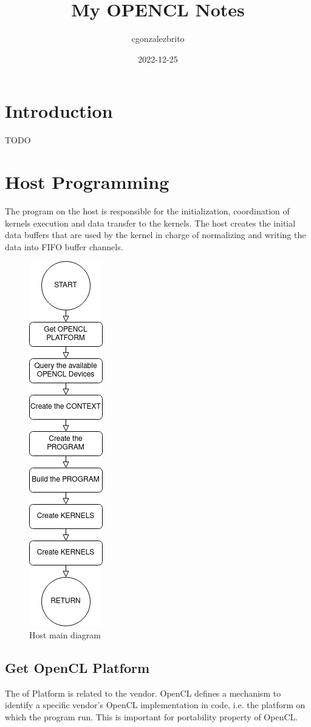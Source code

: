 \documentclass{article}
\title{My OPENCL Notes}
\date{2022-12-25}
\author{cgonzalezbrito}
\begin{document}
  \maketitle
  \newpage
  \section{Introduction}
  TODO
  \section{Host Programming}
  The program on the host is responsible for the initialization, coordination of kernels execution and data transfer to the kernels. The host creates the initial data buffers that are used by the kernel in charge of normalizing and writing the data into FIFO buffer channels.

 \begin{figure}[h!]
    \includegraphics[width=0.2\linewidth]{images/host_diagram.png}
    \caption{Host main diagram}
    \label{fig:Host functions main diagram}
  \end{figure}

  \subsection{Get OpenCL Platform}
  The of Platform is related to the vendor. OpenCL defines a mechanism to identify a specific vendor’s OpenCL implementation in code, i.e. the platform on which the program run. This is important for portability property of OpenCL.
\end{document}
